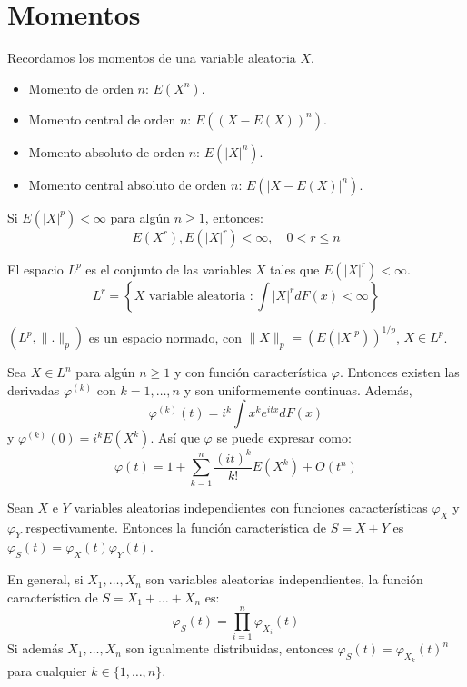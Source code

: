 \section{Momentos}
Recordamos los momentos de una variable aleatoria $X$.
\begin{itemize}
    \item Momento de orden $n$: $E(X^n)$.
    \item Momento central de orden $n$: $E((X-E(X))^n)$.
    \item Momento absoluto de orden $n$: $E(|X|^n)$.
    \item Momento central absoluto de orden $n$: $E(|X-E(X)|^n)$.
\end{itemize}

\begin{proposition}
    Si $E(|X|^p) < \infty$ para algún $n \geq 1$, entonces:
    $$E(X^r), E(|X|^r) < \infty, \quad 0 < r \leq n$$
\end{proposition}

\begin{definition}
    El espacio $L^p$ es el conjunto de las variables $X$ tales que $E(|X|^r) < \infty$.
    $$L^r = \left\{X \text{ variable aleatoria } : \int |X|^rdF(x) < \infty\right\}$$

    $(L^p, \|.\|_p)$ es un espacio normado, con $\|X\|_p = (E(|X|^p))^{1/p}$, $X \in L^p$.
\end{definition}

\begin{theorem}
    Sea $X \in L^n$ para algún $n \geq 1$ y con función característica $\varphi$.
    Entonces existen las derivadas $\varphi^{(k)}$ con $k = 1, \dots, n$ y son uniformemente continuas.
    Además,
    $$\varphi^{(k)}(t) = i^k \int x^ke^{itx}dF(x)$$
    y $\varphi^{(k)}(0) = i^kE(X^k)$.
    Así que $\varphi$ se puede expresar como:
    $$\varphi(t) = 1 + \sum_{k=1}^n \frac{(it)^k}{k!}E(X^k) + O(t^n)$$
\end{theorem}

\begin{proposition}
    Sean $X$ e $Y$ variables aleatorias independientes con funciones características $\varphi_X$ y $\varphi_Y$ respectivamente.
    Entonces la función característica de $S = X+Y$ es $\varphi_S(t) = \varphi_X(t)\varphi_Y(t)$.
\end{proposition}

En general, si $X_1, \dots, X_n$ son variables aleatorias independientes, la función característica de $S = X_1 + \dots + X_n$ es:
$$\varphi_S(t) = \prod_{i=1}^n \varphi_{X_i}(t)$$
Si además $X_1, \dots, X_n$ son igualmente distribuidas, entonces $\varphi_S(t) = \varphi_{X_k}(t)^n$ para cualquier $k \in \{1, \dots, n\}$.


